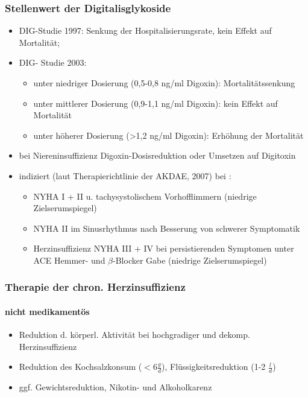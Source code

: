 \documentclass[10pt,a4paper]{report}
\begin{document}
\subsubsection{Stellenwert der Digitalisglykoside}
\begin{itemize}
	\item DIG-Studie 1997: Senkung der Hospitalisierungsrate, kein Effekt auf Mortalität;
	\item DIG- Studie 2003:
	\begin{itemize}
		\item unter niedriger Dosierung (0,5-0,8 ng/ml Digoxin): Mortalitätssenkung 
		\item unter mittlerer Dosierung (0,9-1,1 ng/ml Digoxin): kein Effekt auf Mortalität 
		\item unter höherer Dosierung (>1,2 ng/ml Digoxin): Erhöhung der Mortalität 
	\end{itemize}

	\item bei Niereninsuffizienz Digoxin-Dosisreduktion oder Umsetzen auf Digitoxin
	\item indiziert (laut Therapierichtlinie der AKDAE, 2007) bei :
	\begin{itemize}
		\item NYHA I + II u. tachysystolischem Vorhofflimmern (niedrige Zielserumspiegel)
		\item NYHA II im Sinusrhythmus nach Besserung von schwerer Symptomatik
		\item Herzinsuffizienz NYHA III + IV bei persistierenden Symptomen unter ACE Hemmer- und $\beta$-Blocker Gabe (niedrige Zielserumspiegel)
	\end{itemize}
\end{itemize}
\subsubsection{Therapie der chron. Herzinsuffizienz}
\paragraph{nicht medikamentös}
\begin{itemize}
	\item Reduktion d. körperl. Aktivität bei hochgradiger und dekomp.  Herzinsuffizienz
	\item Reduktion des Kochsalzkonsum ($<6\frac{g}{d}$), Flüssigkeitsreduktion (1-2 $\frac{l}{d}$)
	\item ggf. Gewichtsreduktion, Nikotin- und Alkoholkarenz
\end{itemize}
\end{document}
